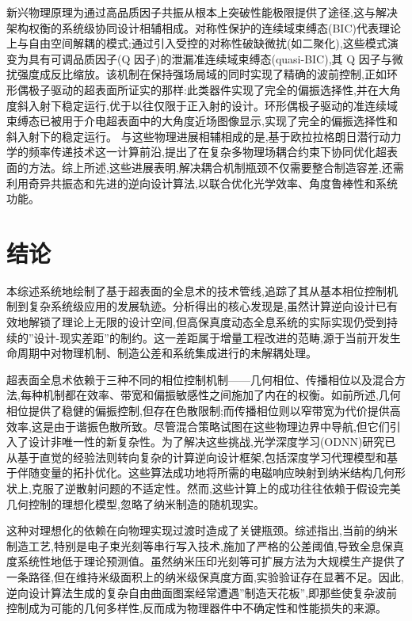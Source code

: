 新兴物理原理为通过高品质因子共振从根本上突破性能极限提供了途径,这与解决架构权衡的系统级协同设计相辅相成。对称性保护的连续域束缚态(BIC)代表理论上与自由空间解耦的模式;通过引入受控的对称性破缺微扰(如二聚化),这些模式演变为具有可调品质因子(Q 因子)的泄漏准连续域束缚态(quasi-BIC),其 Q 因子与微扰强度成反比缩放。该机制在保持强场局域的同时实现了精确的波前控制,正如环形偶极子驱动的超表面所证实的那样:此类器件实现了完全的偏振选择性,并在大角度斜入射下稳定运行,优于以往仅限于正入射的设计。环形偶极子驱动的准连续域束缚态已被用于介电超表面中的大角度近场图像显示,实现了完全的偏振选择性和斜入射下的稳定运行。\citep{s2_5a46bf1115a13c8e88d03d52a56e80871e3550cd_094f009d} 与这些物理进展相辅相成的是,基于欧拉拉格朗日潜行动力学的频率传递技术这一计算前沿,提出了在复杂多物理场耦合约束下协同优化超表面的方法。综上所述,这些进展表明,解决耦合机制瓶颈不仅需要整合制造容差,还需利用奇异共振态和先进的逆向设计算法,以联合优化光学效率、角度鲁棒性和系统功能。\citep{doi_10_1103_physrevapplied_21_044004_d1b93ffe} \citep{s2_5a46bf1115a13c8e88d03d52a56e80871e3550cd_094f009d} \citep{doi_10_1038_s41467_025_57516_z_7c69e056}

\section{结论}\label{ux7ed3ux8bba}

本综述系统地绘制了基于超表面的全息术的技术管线,追踪了其从基本相位控制机制到复杂系统级应用的发展轨迹。分析得出的核心发现是,虽然计算逆向设计已有效地解锁了理论上无限的设计空间,但高保真度动态全息系统的实际实现仍受到持续的''设计-现实差距''的制约。这一差距属于增量工程改进的范畴,源于当前开发生命周期中对物理机制、制造公差和系统集成进行的未解耦处理。

超表面全息术依赖于三种不同的相位控制机制------几何相位、传播相位以及混合方法,每种机制都在效率、带宽和偏振敏感性之间施加了内在的权衡。如前所述,几何相位提供了稳健的偏振控制,但存在色散限制;而传播相位则以窄带宽为代价提供高效率,这是由于谐振色散所致。尽管混合策略试图在这些物理边界中导航,但它们引入了设计非唯一性的新复杂性。为了解决这些挑战,光学深度学习(ODNN)研究已从基于直觉的经验法则转向复杂的计算逆向设计框架,包括深度学习代理模型和基于伴随变量的拓扑优化。这些算法成功地将所需的电磁响应映射到纳米结构几何形状上,克服了逆散射问题的不适定性。然而,这些计算上的成功往往依赖于假设完美几何控制的理想化模型,忽略了纳米制造的随机现实。

这种对理想化的依赖在向物理实现过渡时造成了关键瓶颈。综述指出,当前的纳米制造工艺,特别是电子束光刻等串行写入技术,施加了严格的公差阈值,导致全息保真度系统性地低于理论预测值。虽然纳米压印光刻等可扩展方法为大规模生产提供了一条路径,但在维持米级面积上的纳米级保真度方面,实验验证存在显著不足。因此,逆向设计算法生成的复杂自由曲面图案经常遭遇''制造天花板'',即那些使复杂波前控制成为可能的几何多样性,反而成为物理器件中不确定性和性能损失的来源。

